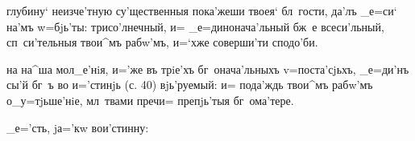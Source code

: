   глубину` неизче'тную су'щественныя 
пока'жеши твоея` бл~гости, да'лъ _е=си` на'мъ w=бjь'ты: 
трисо'лнечный, и= _е=динонача'льный бж~е всеси'льный, 
сп~си'тельныя твои^мъ рабw'мъ, и=`хже соверши'ти 
сподо'би.

  на на^ша мол_е'нiя, и='же въ 
трiе'хъ бг~онача'льныхъ v=поста'сjьхъ, _е=ди'нъ сы'й бг~ъ 
во и='стинjь (с. 40) вjь'руемый: и= пода'ждь твои^мъ 
рабw'мъ о_у=тjьше'нiе, мл~твами преч и= препjь'тыя 
бг~ома'тере.

            
_е='сть, jа='кw вои'стинну: 
